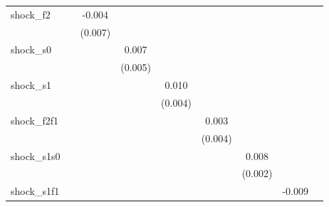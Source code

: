 {\begin{tabular}{l*{8}{c}}
\addlinespace
shock\_f2    &                     &      -0.004         &                     &                     &                     &                     &                     &                     \\
            &                     &     (0.007)         &                     &                     &                     &                     &                     &                     \\
\addlinespace
shock\_s0    &                     &                     &       0.007         &                     &                     &                     &                     &                     \\
            &                     &                     &     (0.005)         &                     &                     &                     &                     &                     \\
\addlinespace
shock\_s1    &                     &                     &                     &       0.010\sym{**} &                     &                     &                     &                     \\
            &                     &                     &                     &     (0.004)         &                     &                     &                     &                     \\
\addlinespace
shock\_f2f1  &                     &                     &                     &                     &       0.003         &                     &                     &                     \\
            &                     &                     &                     &                     &     (0.004)         &                     &                     &                     \\
\addlinespace
shock\_s1s0  &                     &                     &                     &                     &                     &       0.008\sym{***}&                     &                     \\
            &                     &                     &                     &                     &                     &     (0.002)         &                     &                     \\
\addlinespace
shock\_s1f1  &                     &                     &                     &                     &                     &                     &      -0.009         &                     \\

\end{tabular}}

